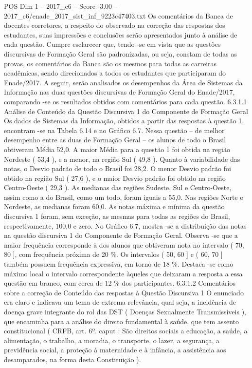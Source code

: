 \begin{textsample}{POS Dim 1 – 2017\_c6 – Score -3.00 – 2017\_c6/enade\_2017\_sist\_inf\_9223c47403.txt}
Os comentários da Banca de docentes corretores, a respeito do observado na correção das respostas dos estudantes, suas impressões e conclusões serão apresentados junto à análise de cada questão.
Cumpre esclarecer que, tendo -se em vista que as questões discursivas de Formação Geral são padronizadas, ou seja, constam de todas as provas, os comentários da Banca são os mesmos para todas as carreiras acadêmicas, sendo direcionados a todos os estudantes que participaram do Enade/2017.
A seguir, serão analisados os desempenhos da Área de Sistemas da Informação nas duas questões discursivas de Formação Geral do Enade/2017, comparando -se os resultados obtidos com comentários para cada questão. 6.3.1.1 Análise de Conteúdo da Questão Discursiva 1 do Componente de Formação Geral Os dados de Sistemas da Informação, obtidos a partir das respostas à questão 1, encontram -se na Tabela 6.14 e no Gráfico 6.7.
Nessa questão – de melhor desempenho entre as duas de Formação Geral – os alunos de todo o Brasil obtiveram Média 52,0.
A maior Média para a questão 1 foi obtida na região Nordeste ( 53,4 ), e a menor, na região Sul ( 49,8 ).
Quanto à variabilidade das notas, o Desvio padrão de todo o Brasil foi 28,2.
O menor Desvio padrão foi obtido na região Sul ( 27,6 ), e o maior Desvio padrão foi obtido na região Centro-Oeste ( 29,3 ).
As medianas das regiões Sudeste, Sul e Centro-Oeste, assim como a do Brasil, como um todo, foram iguais a 55,0.
Nas regiões Norte e Nordeste, as medianas foram 60,0.
As notas máxima e mínima da questão discursiva 1 foram, sem exceção, as mesmas para todas as regiões do Brasil, respectivamente, 100,0 e zero.
No Gráfico 6.7, mostra -se a distribuição das notas na questão discursiva 1 do Componente de Formação Geral.
Observa -se que a maior frequência corresponde à dos alunos que obtiveram nota no intervalo ( 70, 80 ], com frequência próxima de 20 \%.
Os intervalos ( 50, 60 ] e ( 60, 70 ] também possuem frequência expressiva, em torno de 18 \%.
Destaca -se como máximo local o intervalo correspondente àqueles que deixaram a resposta a essa questão em branco, com cerca de 12 \% dos participantes. 6.3.1.2 Comentários sobre a correção de Conteúdo das respostas à Questão Discursiva 1 O enunciado era claro e indicava um tema de extrema relevância, qual seja, a incidência de doença grave integrante do rol das DST ( Doenças Sexualmente Transmissíveis ), que encaminha para a análise do direito fundamental à saúde, que tem assento constitucional ( CRFB, art. 6º. caput : São direitos sociais a educação, a saúde, a alimentação, o trabalho, a moradia, o transporte, o lazer, a segurança, a previdência social, a proteção à maternidade e à infância, a assistência aos desamparados, na forma desta Constituição ).

\end{textsample}
